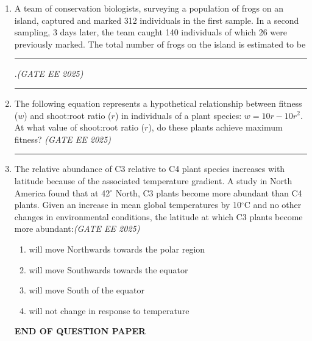 \documentclass[11pt,a4paper]{article}
\begin{document}
\begin{enumerate}[leftmargin=*,label=\textbf{Q.\arabic*},resume]
\item A team of conservation biologists, surveying a population of frogs on an island, captured and marked 312 individuals in the first sample. In a second sampling, 3 days later, the team caught 140 individuals of which 26 were previously marked. The total number of frogs on the island is estimated to be \rule{4cm}{0.15mm}.\hfill \textit{(GATE EE 2025)}

\rule{4cm}{0.15mm}

\item The following equation represents a hypothetical relationship between fitness ($w$) and shoot:root ratio ($r$) in individuals of a plant species: $w = 10r-10r^2$. At what value of shoot:root ratio ($r$), do these plants achieve maximum fitness?
\hfill \textit{(GATE EE 2025)}
\rule{4cm}{0.15mm}

\item The relative abundance of C3 relative to C4 plant species increases with latitude because of the associated temperature gradient. A study in North America found that at 42$^\circ$ North, C3 plants become more abundant than C4 plants. Given an increase in mean global temperatures by 10$^\circ$C and no other changes in environmental conditions, the latitude at which C3 plants become more abundant:\hfill \textit{(GATE EE 2025)}
\begin{enumerate}[label=(\Alph*)]
\item will move Northwards towards the polar region
\item will move Southwards towards the equator
\item will move South of the equator
\item will not change in response to temperature
\end{enumerate}
\begin{center}
  \textbf{END OF QUESTION PAPER}  
\end{center}
\end{enumerate}
\end{document}
